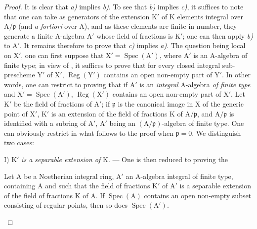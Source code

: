 \begin{proof}
It is clear that \emph{a)} implies \emph{b)}. To see that \emph{b)} implies \emph{c)}, it suffices to note
that one can take as generators of the extension $\mathrm{K}'$ of $\mathrm{K}$ elements integral over $\mathrm{A}/\mathfrak{p}$
(and \emph{a fortiori} over $\mathrm{A}$), and as these elements are finite in number, they generate a finite
$\mathrm{A}$-algebra $\mathrm{A}'$ whose field of fractions is $\mathrm{K}'$; one can then apply \emph{b)} to $\mathrm{A}'$.
It remains therefore to prove that \emph{c)} implies \emph{a)}. The question being local on $\mathrm{X}'$, one can
first suppose that $\mathrm{X}'=\operatorname{Spec}(\mathrm{A}')$, where $\mathrm{A}'$ is an $\mathrm{A}$-algebra of finite type; in view of
, it suffices to prove that for every closed integral sub-prescheme $\mathrm{Y}'$
of $\mathrm{X}'$, $\operatorname{Reg}(\mathrm{Y}')$ contains an open non-empty part of $\mathrm{Y}'$. In other words, one can restrict
to proving that if $\mathrm{A}'$ is an \emph{integral} $\mathrm{A}$-algebra \emph{of finite type} and $\mathrm{X}'=\operatorname{Spec}(\mathrm{A}')$,
$\operatorname{Reg}(\mathrm{X}')$ contains an open non-empty part of $\mathrm{X}'$. Let $\mathrm{K}'$ be the field of fractions of $\mathrm{A}'$;
if $\mathfrak{p}$ is the canonical image in $\mathrm{X}$ of the generic point of $\mathrm{X}'$, $\mathrm{K}'$ is an extension of the
field of fractions $\mathrm{K}$ of $\mathrm{A}/\mathfrak{p}$, and $\mathrm{A}/\mathfrak{p}$ is identified with a subring of $\mathrm{A}'$, $\mathrm{A}'$ being an
$(\mathrm{A}/\mathfrak{p})$-algebra of finite type. One can obviously restrict in what follows to the proof
when $\mathfrak{p}=0$. We distinguish two cases:

I) $\mathrm{K}'$ \emph{is a separable extension of} $\mathrm{K}$. --- One is then reduced to proving the

\begin{lemma}[6.12.4.1]
\label{IV.6.12.4.1}
Let $\mathrm{A}$ be a Noetherian integral ring, $\mathrm{A}'$ an $\mathrm{A}$-algebra integral
of finite type, containing $\mathrm{A}$ and such that the field of fractions $\mathrm{K}'$ of $\mathrm{A}'$ is a separable extension of the
field of fractions $\mathrm{K}$ of $\mathrm{A}$. If $\operatorname{Spec}(\mathrm{A})$ contains an open non-empty subset consisting of regular points, then
so does $\operatorname{Spec}(\mathrm{A}')$.
\end{lemma}


\end{proof}

